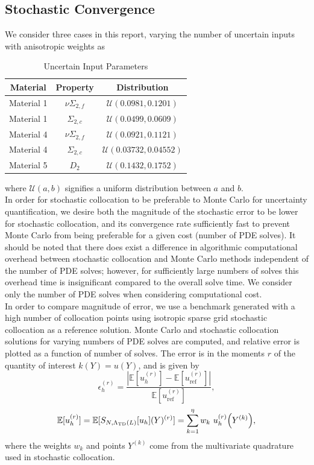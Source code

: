 \documentclass[11pt]{article}
\newcommand{\expv}[1]{\ensuremath{\mathbb{E}[ #1]}}
\begin{document}
\subsection{Stochastic Convergence}
We consider three cases in this report, varying the number of uncertain inputs with anisotropic weights as
\begin{table}[H]
\centering
\begin{tabular}{c|c|c}
Material & Property & Distribution \\ \hline
Material 1 & $\nu\Sigma_{2,f}$ & $\mathcal{U}(0.0981,0.1201)$ \\
Material 1 & $\Sigma_{2,c}$ & $\mathcal{U}(0.0499,0.0609)$  \\
Material 4 & $\nu\Sigma_{2,f}$ & $\mathcal{U}(0.0921,0.1121)$ \\
Material 4 & $\Sigma_{2,c}$ & $\mathcal{U}(0.03732,0.04552)$  \\
Material 5 & $D_2$ & $\mathcal{U}(0.1432,0.1752)$ 
\end{tabular}
\caption{Uncertain Input Parameters}
\label{params}
\end{table}
where $\mathcal{U}(a,b)$ signifies a uniform distribution between $a$ and $b$.\\

In order for stochastic collocation to be preferable to Monte Carlo for uncertainty quantification, we desire both the magnitude of the stochastic error to be lower for stochastic collocation, and its convergence rate sufficiently fast to prevent Monte Carlo from being preferable for a given cost (number of PDE solves).  It should be noted that there does exist a difference in algorithmic computational overhead between stochastic collocation and Monte Carlo methods independent of the number of PDE solves; however, for sufficiently large numbers of solves this overhead time is insignificant compared to the overall solve time.  We consider only the number of PDE solves when considering computational cost.\\

In order to compare magnitude of error, we use a benchmark generated with a high number of collocation points using isotropic sparse grid stochastic collocation as a reference solution.  Monte Carlo and stochastic collocation solutions for varying numbers of PDE solves are computed, and relative error is plotted as a function of number of solves.  The error is in the moments $r$ of the quantity of interest $k(Y)=u(Y)$, and is given by
\begin{equation}
\epsilon_h^{(r)}=\frac{|\expv{u_h^{(r)}}-\expv{u_\text{ref}^{(r)}}|}{\expv{u_\text{ref}^{(r)}}},
\end{equation}
\begin{equation}
\expv{u_h^{(r)}}=\expv{S_{N,\Lambda_\text{TD}(L)}[u_h](Y)^{(r)}}=\sum_{k=1}^\eta w_k ~u_h^{(r)}\qty(Y^{(k)}),
\end{equation}
where the weights $w_k$ and points $Y^{(k)}$ come from the multivariate quadrature used in stochastic collocation.\\
\end{document}
